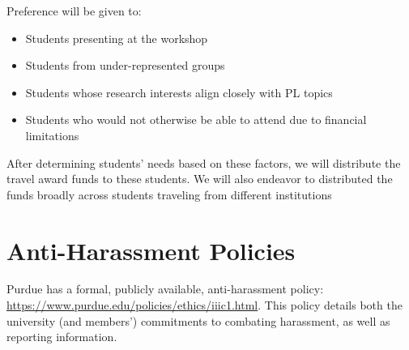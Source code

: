 \documentclass[11pt]{article}
\begin{document}
Preference will be given to: 

\begin{itemize}
\item Students presenting at the workshop
\item Students from under-represented groups
\item Students whose research interests align closely with PL topics
\item Students who would not otherwise be able to attend due to
financial limitations
\end{itemize}

After determining students' needs based on these
factors, we will distribute the travel award funds to
these students. We will also endeavor to distributed the funds broadly across students traveling from different institutions

\section{Anti-Harassment Policies}

Purdue has a formal, publicly available, anti-harassment policy: \url{https://www.purdue.edu/policies/ethics/iiic1.html}. This policy details both the university (and members') commitments to combating harassment, as well as reporting information.
\end{document}
